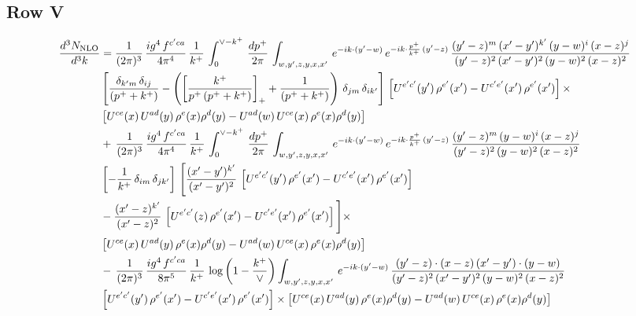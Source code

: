 \documentclass[9pt]{article}
\numberwithin{equation}{section}
\begin{document}
\subsection{Row V}
\begin{align}
    \frac{d^{3}N_{\rm NLO}}{d^{3}k} & =  \frac{1}{(2\pi)^{3}}\, \frac{ig^{4}\,f^{c'ca}}{4\pi^{4}}\, \frac{1}{k^{+}}\,\int_{0}^{\vee-k^{+}}\, \frac{dp^{+}}{2\pi}\, \int_{w,y',z,y,x,x'}\, e^{-ik\cdot (y'-w)}\, e^{-ik\cdot \frac{p^{+}}{k^{+}}\,(y'-z)}\,\frac{(y'-z)^{m}\,(x'-y')^{k'}\,(y-w)^{i}\,(x-z)^{j}}{(y'-z)^{2}\,(x'-y')^{2}\,(y-w)^{2}\,(x-z)^{2}}\notag \\ & \left[\frac{\delta_{k'm}\,\delta_{ij}}{(p^{+}+k^{+})}-\left(\left[\frac{k^{+}}{p^{+}\,(p^{+}+k^{+})}\right]_{+}+\frac{1}{(p^{+}+k^{+})}\right)\,\delta_{jm}\,\delta_{ik'}\right]\, \left[U^{e'c'}(y')\,\rho^{e'}(x')-U^{c'e'}(x')\,\rho^{e'}(x')\right]\times \notag \\ &  \left[U^{ce}(x)\,U^{ad}(y)\,\rho^{e}(x)\rho^{d}(y)-U^{ad}(w)\,U^{ce}(x)\,\rho^{e}(x)\rho^{d}(y)\right] \notag \\
&   +\,\frac{1}{(2\pi)^{3}}\, \frac{ig^{4}\,f^{c'ca}}{4\pi^{4}}\, \frac{1}{k^{+}}\,\int_{0}^{\vee-k^{+}}\, \frac{dp^{+}}{2\pi}\, \int_{w,y',z,y,x,x'}\, e^{-ik\cdot (y'-w)}\, e^{-ik\cdot \frac{p^{+}}{k^{+}}\,(y'-z)}\,\frac{(y'-z)^{m}\,(y-w)^{i}\,(x-z)^{j}}{(y'-z)^{2}\,(y-w)^{2}\,(x-z)^{2}}\notag \\ &   \left[-\frac{1}{k^{+}}\, \delta_{im}\, \delta_{jk'}\right]\, \Bigg[\frac{(x'-y')^{k'}}{(x'-y')^{2}}\,\left[U^{e'c'}(y')\,\rho^{e'}(x')-U^{c'e'}(x')\,\rho^{e'}(x')\right]\notag \\ & -\frac{(x'-z)^{k'}}{(x'-z)^{2}}\,\left[U^{e'c'}(z)\,\rho^{e'}(x')-U^{c'e'}(x')\,\rho^{e'}(x')\right]\Bigg]\times \notag \\ &    \left[U^{ce}(x)\,U^{ad}(y)\,\rho^{e}(x)\rho^{d}(y)-U^{ad}(w)\,U^{ce}(x)\,\rho^{e}(x)\rho^{d}(y)\right] \notag \\
& -\,\frac{1}{(2\pi)^{3}}\, \frac{ig^{4}\,f^{c'ca}}{8\pi^{5}}\, \frac{1}{k^{+}}\,\log{\left(1-\frac{k^{+}}{\vee}\right)} \int_{w,y',z,y,x,x'}\, e^{-ik\cdot (y'-w)}\,\frac{(y'-z)\cdot (x-z)\,(x'-y')\cdot (y-w)}{(y'-z)^{2}\,(x'-y')^{2}\,(y-w)^{2}\,(x-z)^{2}}\notag \\ & \left[U^{e'c'}(y')\,\rho^{e'}(x')-U^{c'e'}(x')\,\rho^{e'}(x')\right]\times  \left[U^{ce}(x)\,U^{ad}(y)\,\rho^{e}(x)\rho^{d}(y)-U^{ad}(w)\,U^{ce}(x)\,\rho^{e}(x)\rho^{d}(y)\right]
\end{align}
\end{document}
